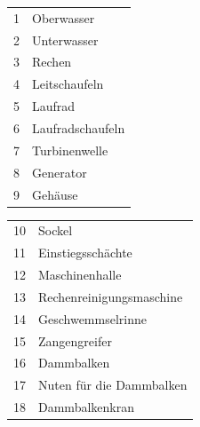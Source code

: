 \begin{minipage}[t]{0.38\columnwidth}
    \begin{tabular}{c l}
        1 & Oberwasser \\
        2 & Unterwasser \\
        3 & Rechen \\
        4 & Leitschaufeln \\
        5 & Laufrad \\
        6 & Laufradschaufeln \\
        7 & Turbinenwelle \\
        8 & Generator \\
        9 & Gehäuse \\
    \end{tabular}
\end{minipage}
\hfill
\begin{minipage}[t]{0.58\columnwidth}
    \begin{tabular}{c l}
        10 & Sockel \\
        11 & Einstiegsschächte \\
        12 & Maschinenhalle \\
        13 & Rechenreinigungsmaschine \\
        14 & Geschwemmselrinne \\
        15 & Zangengreifer \\
        16 & Dammbalken \\
        17 & Nuten für die Dammbalken \\
        18 & Dammbalkenkran \\
    \end{tabular}
\end{minipage}




































